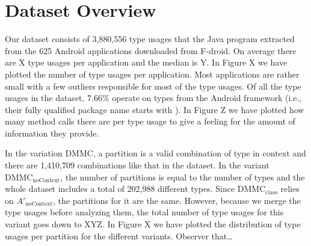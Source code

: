 

\section{Dataset Overview}


Our dataset consists of 3,880,556 type usages that the Java program extracted from the 625 Android applications downloaded from F-droid.
On average there are X type usages per application and the median is Y.
In Figure X we have plotted the number of type usages per application.
Most applications are rather small with a few outliers responsible for most of the type usages.
Of all the type usages in the dataset, $7.66\%$ operate on types from the Android framework (i.e., their fully qualified package name starts with ).
In Figure Z we have plotted how many method calls there are per type usage to give a feeling for the amount of information they provide.

In the variation $\text{DMMC}$, a partition is a valid combination of type in context and there are 1,410,709 combinations like that in the dataset.
In the variant $\text{DMMC}_{\text{noContext}}$, the number of partitions is equal to the number of types and the whole dataset includes a total of 202,988 different types.
Since $\text{DMMC}_{\text{class}}$ relies on $A'_\text{noContext}$, the partitions for it are the same.
However, because we merge the type usages before analyzing them, the total number of type usages for this variant goes down to XYZ.
In Figure X we have plotted the distribution of type usages per partition for the different variants.
Observer that\ldots 
{}

